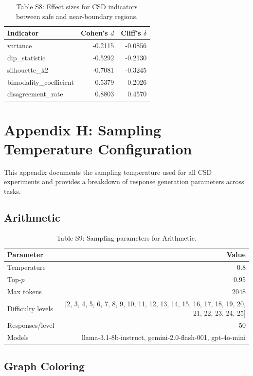 \documentclass[11pt]{article}
\begin{document}
\begin{table}[h]\centering\small
\caption{Table S8: Effect sizes for CSD indicators between safe and near-boundary regions.}
\label{tab:effect_sizes}
\begin{tabular}{l|r|r}
\toprule
Indicator & Cohen's $d$ & Cliff's $\delta$ \\
\midrule
variance & -0.2115 & -0.0856 \\
dip\_statistic & -0.5292 & -0.2130 \\
silhouette\_k2 & -0.7081 & -0.3245 \\
bimodality\_coefficient & -0.5379 & -0.2026 \\
disagreement\_rate & 0.8803 & 0.4570 \\
\bottomrule
\end{tabular}
\end{table}


\clearpage


\section{Appendix H: Sampling Temperature Configuration}
\label{app:temperature}

This appendix documents the sampling temperature used for all CSD experiments
and provides a breakdown of response generation parameters across tasks.

\subsection{Arithmetic}

\begin{table}[h]\centering\small
\caption{Table S9: Sampling parameters for Arithmetic.}
\begin{tabular}{l|r}
\toprule
Parameter & Value \\
\midrule
Temperature & 0.8 \\
Top-$p$ & 0.95 \\
Max tokens & 2048 \\
Difficulty levels & [2, 3, 4, 5, 6, 7, 8, 9, 10, 11, 12, 13, 14, 15, 16, 17, 18, 19, 20, 21, 22, 23, 24, 25] \\
Responses/level & 50 \\
Models & llama-3.1-8b-instruct, gemini-2.0-flash-001, gpt-4o-mini \\
\bottomrule
\end{tabular}
\end{table}

\subsection{Graph Coloring}
\end{document}
